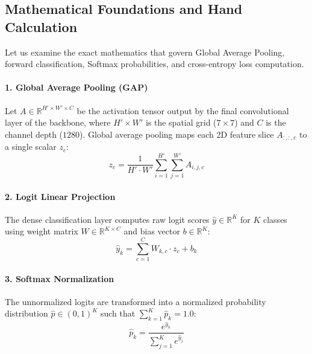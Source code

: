 \subsection{Mathematical Foundations and Hand Calculation}\label{subsec:p2_math}

Let us examine the exact mathematics that govern Global Average Pooling, forward classification, Softmax probabilities, and cross-entropy loss computation.

\paragraph{1. Global Average Pooling (GAP)}
Let $A \in \mathbb{R}^{H' \times W' \times C}$ be the activation tensor output by the final convolutional layer of the backbone, where $H' \times W'$ is the spatial grid ($7 \times 7$) and $C$ is the channel depth ($1280$). Global average pooling maps each 2D feature slice $A_{:,:,c}$ to a single scalar $z_c$:
\begin{equation}
z_c = \frac{1}{H' \cdot W'} \sum_{i=1}^{H'} \sum_{j=1}^{W'} A_{i,j,c}\label{eq:gap_formula}
\end{equation}

\paragraph{2. Logit Linear Projection}
The dense classification layer computes raw logit scores $\hat{y} \in \mathbb{R}^K$ for $K$ classes using weight matrix $W \in \mathbb{R}^{K \times C}$ and bias vector $b \in \mathbb{R}^K$:
\begin{equation}
\hat{y}_k = \sum_{c=1}^C W_{k,c} \cdot z_c + b_k\label{eq:logit_formula}
\end{equation}

\paragraph{3. Softmax Normalization}
The unnormalized logits are transformed into a normalized probability distribution $\hat{p} \in (0, 1)^K$ such that $\sum_{k=1}^K \hat{p}_k = 1.0$:
\begin{equation}
\hat{p}_k = \frac{e^{\hat{y}_k}}{\sum_{j=1}^K e^{\hat{y}_j}}\label{eq:softmax_formula}
\end{equation}

